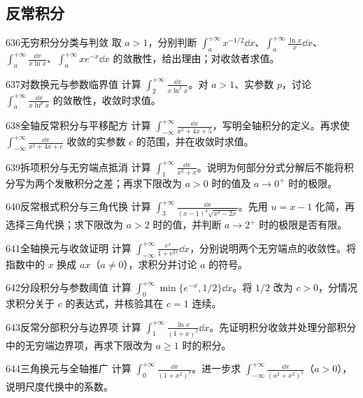 \subsection{反常积分}
\begin{exercise}{636}{无穷积分分类与判敛}
取 $a>1$，分别判断 $\int_a^{+\infty}x^{-1/2}\dd x$、$\int_a^{+\infty}\frac{\ln x}{x}\dd x$、$\int_a^{+\infty}\frac{\dd x}{x\ln x}$、$\int_a^{+\infty}xe^{-x}\dd x$ 的敛散性，给出理由；对收敛者求值。
\end{exercise}
\begin{exercise}{637}{对数换元与参数临界值}
计算 $\int_2^{+\infty}\frac{\dd x}{x\ln^2x}$。对 $a>1$、实参数 $p$，讨论 $\int_a^{+\infty}\frac{\dd x}{x\ln^px}$ 的敛散性，收敛时求值。
\end{exercise}
\begin{exercise}{638}{全轴反常积分与平移配方}
计算 $\int_{-\infty}^{+\infty}\frac{\dd x}{x^2+4x+5}$，写明全轴积分的定义。再求使 $\int_{-\infty}^{+\infty}\frac{\dd x}{x^2+4x+c}$ 收敛的实参数 $c$ 的范围，并在收敛时求值。
\end{exercise}
\begin{exercise}{639}{拆项积分与无穷端点抵消}
计算 $\int_1^{+\infty}\frac{\dd x}{x^2+x}$。说明为何部分分式分解后不能将积分写为两个发散积分之差；再求下限改为 $a>0$ 时的值及 $a\to0^+$ 时的极限。
\end{exercise}
\begin{exercise}{640}{反常根式积分与三角代换}
计算 $\int_3^{+\infty}\frac{\dd x}{(x-1)^4\sqrt{x^2-2x}}$。先用 $u=x-1$ 化简，再选择三角代换；求下限改为 $a>2$ 时的值，并判断 $a\to2^+$ 时的极限是否有限。
\end{exercise}
\begin{exercise}{641}{全轴换元与收敛证明}
计算 $\int_{-\infty}^{+\infty}\frac{e^x}{1+e^{2x}}\dd x$，分别说明两个无穷端点的收敛性。将指数中的 $x$ 换成 $ax$（$a\ne0$），求积分并讨论 $a$ 的符号。
\end{exercise}
\begin{exercise}{642}{分段积分与参数阈值}
计算 $\int_0^{+\infty}\min\{e^{-x},1/2\}\dd x$。将 $1/2$ 改为 $c>0$，分情况求积分关于 $c$ 的表达式，并核验其在 $c=1$ 连续。
\end{exercise}
\begin{exercise}{643}{反常分部积分与边界项}
计算 $\int_1^{+\infty}\frac{\ln x}{(1+x)^2}\dd x$。先证明积分收敛并处理分部积分中的无穷端边界项，再求下限改为 $a\ge1$ 时的积分。
\end{exercise}
\begin{exercise}{644}{三角换元与全轴推广}
计算 $\int_0^{+\infty}\frac{\dd x}{(1+x^2)^2}$。进一步求 $\int_{-\infty}^{+\infty}\frac{\dd x}{(a^2+x^2)^2}$（$a>0$），说明尺度代换中的系数。
\end{exercise}
